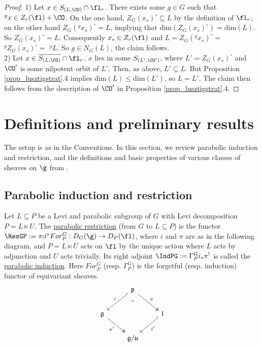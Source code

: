 \begin{proof}
    1) Let $x\in S_{(L,\CO)}\cap\fl_r$. There exists some $g\in G$ such that $^gx\in Z_r(\fl)+\CO$. On the one hand, $Z_G(x_s)^\circ\subseteq L$ by the definition of $\fl_r$; on the other hand $Z_G(^gx_s)^\circ=L$, implying that $\mathrm{dim}(Z_G(x_s)^\circ)=\mathrm{dim}(L)$. So $Z_G(x_s)^\circ=L$. Consequently $x_s\in Z_r(\fl)$ and $L=Z_G(^gx_s)^\circ=$ $^gZ_G(x_s)^\circ=$ $^gL$. So $g\in N_G(L)$, the claim follows.\\

    2) Let $x\in\overline{S_{(L,\CO)}}\cap\fl_r$. $x$ lies in some $S_{(L',\CO')}$, where $L'=Z_G(x_s)^\circ$ and $\CO'$ is some nilpotent orbit of $L'$. Then, as above, $L'\subseteq L$. But Proposition \ref{prop_lusztigstrat}.4 implies $\mathrm{dim}(L)\leq \mathrm{dim}(L')$, so $L=L'$. The claim then follows from the description of $\CO'$ in Proposition \ref{prop_lusztigstrat}.4.

\end{proof}

\section{Definitions and preliminary results}\label{sec_prelim}
The setup is as in the Conventions. In this section, we review parabolic induction and restriction, and the definitions and basic properties of various classes of sheaves on $\g$ from \cites{lusztig_fourier_1987, mirkovic_character_2004}.

\subsection{Parabolic induction and restriction}
\begin{definition}\label{def_para_ind_res}
    Let $L\subseteq P$ be a Levi and parabolic subgroup of $G$ with Levi decomposition $P=L\ltimes U$. The \underline{parabolic restriction} (from $G$ to $L\subseteq P$) is the functor $\ResGP:=\pi_!i^* For^G_P: D_G(\g)\rightarrow D_P(\fl)$, where $i$ and $\pi$ are as in the following diagram, and $P=L\ltimes U$ acts on $\fl$ by the unique action where $L$ acts by adjunction and $U$ acts trivially. Its right adjoint $\IndPG:=\Gamma^G_Pi_*\pi^!$ is called the \underline{parabolic induction}. Here $For^G_P$ (resp. $\Gamma^G_P$) is the forgetful (resp. induction) functor of equivariant sheaves.
\[\begin{tikzcd}
	& {\mathfrak{p}} \\
	{\mathfrak{g}} && {\mathfrak{l}} \\
	& {\mathfrak{g}/\mathfrak{u}}
	\arrow["i"', hook', from=1-2, to=2-1]
	\arrow["\pi", two heads, from=1-2, to=2-3]
	\arrow["{\pi'}"', two heads, from=2-1, to=3-2]
	\arrow["{i'}", hook', from=2-3, to=3-2]
	\arrow["\lrcorner"{anchor=center, pos=0.125, rotate=-45}, draw=none, from=1-2, to=3-2]
\end{tikzcd}\]
\end{definition}

